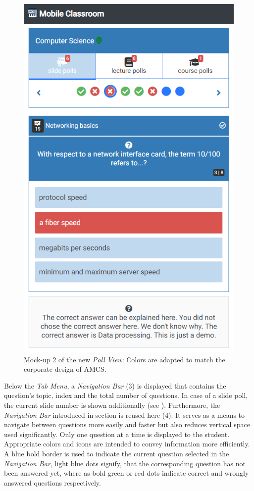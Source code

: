 \begin{figure}[ht]
	\begin{minipage}[t]{\textwidth}
		\centering
		\includegraphics[width=.7\textwidth]{mockups/poll_view_enhancement_v2.png}
		\captionsetup{width=.8\linewidth}
		\caption{Mock-up 2 of the new \emph{Poll View}:
			Colors are adapted to match the corporate design of AMCS.
		}
		\label{figure:pollviewenhanvement2}
	\end{minipage}
\end{figure}
Below the \emph{Tab Menu}, a \emph{Navigation Bar} (3) is displayed that contains the question's topic, index and the total number of questions. In case of a slide poll, the current slide number is shown additionally (see ).
Furthermore, the \emph{Navigation Bar} introduced in section  is reused here (4). It serves as a means to navigate between questions more easily and faster but also reduces vertical space used significantly. Only one question at a time is displayed to the student. Appropriate colors and icons are intended to convey information more efficiently. A blue bold border is used to indicate the current question selected in the \emph{Navigation Bar}, light blue dots signify, that the corresponding question has not been answered yet, where as bold green or red dots indicate correct and wrongly answered questions respectively. 
